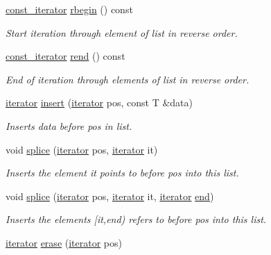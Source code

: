 \begin{DoxyCompactItemize}
\mbox{\hyperlink{structsymlist__iterator}{const\+\_\+iterator}} \mbox{\hyperlink{classsymlist_a3779415d5588f9621494f40789841caf}{rbegin}} () const
\begin{DoxyCompactList}\small\item\em Start iteration through element of list in reverse order. \end{DoxyCompactList}\item 
\mbox{\hyperlink{structsymlist__iterator}{const\+\_\+iterator}} \mbox{\hyperlink{classsymlist_a42379ebaa07ddb1160d785fec701712d}{rend}} () const
\begin{DoxyCompactList}\small\item\em End of iteration through elements of list in reverse order. \end{DoxyCompactList}\item 
\mbox{\hyperlink{structsymlist__iterator}{iterator}} \mbox{\hyperlink{classsymlist_a8b3327b8a33b180bf1eb802856f755c3}{insert}} (\mbox{\hyperlink{structsymlist__iterator}{iterator}} pos, const T \&data)
\begin{DoxyCompactList}\small\item\em Inserts {\ttfamily data} before {\ttfamily pos} in list. \end{DoxyCompactList}\item 
void \mbox{\hyperlink{classsymlist_ac2bd4d9db62ea6a3282662c62a97c3b2}{splice}} (\mbox{\hyperlink{structsymlist__iterator}{iterator}} pos, \mbox{\hyperlink{structsymlist__iterator}{iterator}} it)
\begin{DoxyCompactList}\small\item\em Inserts the element {\ttfamily it} points to before {\ttfamily pos} into this list. \end{DoxyCompactList}\item 
void \mbox{\hyperlink{classsymlist_a27889c85e97c1e8dec7a871987a12b29}{splice}} (\mbox{\hyperlink{structsymlist__iterator}{iterator}} pos, \mbox{\hyperlink{structsymlist__iterator}{iterator}} it, \mbox{\hyperlink{structsymlist__iterator}{iterator}} \mbox{\hyperlink{classsymlist_a7283589fa01f79d722f8256d7a6a7883}{end}})
\begin{DoxyCompactList}\small\item\em Inserts the elements {\ttfamily \mbox{[}it,end)} refers to before {\ttfamily pos} into this list. \end{DoxyCompactList}\item 
\mbox{\hyperlink{structsymlist__iterator}{iterator}} \mbox{\hyperlink{classsymlist_a75fc1fc7db7b20cc430ddb8577608904}{erase}} (\mbox{\hyperlink{structsymlist__iterator}{iterator}} pos)

\end{DoxyCompactItemize}
